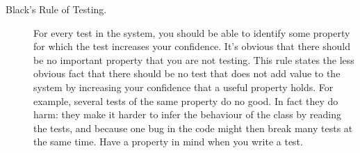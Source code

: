 \documentclass[a4paper,10pt,twoside]{book}
\begin{document}
{\begin{description}
\item[Black's Rule of Testing.]
  For every test in the system, you should be able to identify some property for which
  the test increases your confidence.
  It's obvious that there should be no important property that you are not testing.
  This rule states the less obvious fact that there should be
  no test that does not add value to the system by increasing your confidence that a useful property
  holds.
  For example, several tests of the same property do no good. 
  In fact they do harm: they make it harder to infer the behaviour of the class by reading the tests, and
  because one bug in the code might then break many tests at the same time.
  Have a property in mind when you write a test.
\end{description}





}
\end{document}
